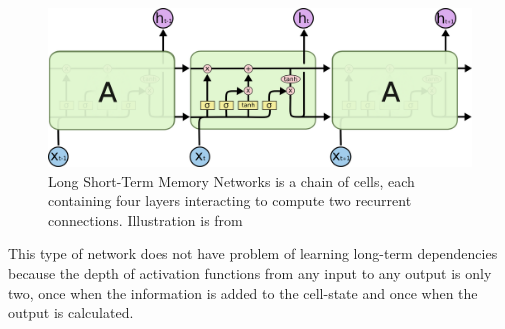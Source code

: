 \begin{figure}
	\centering
	\includegraphics[width=\textwidth]{sections/theory/LSTM3-chain.png}
	\caption{Long Short-Term Memory Networks is a chain of cells, each containing four layers 
		interacting to compute two recurrent connections. Illustration is from \cite{rnn}}
	\label{fig:lstm}
\end{figure}

This type of network does not have problem of learning long-term dependencies because the depth  
of activation functions from any input to any output is only two, once when the information is 
added to the cell-state and once when the output is calculated. 


